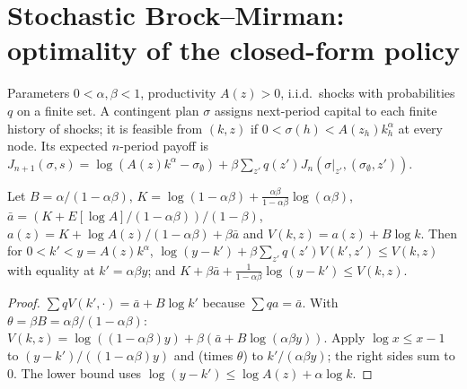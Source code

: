 \section{Stochastic Brock--Mirman: optimality of the closed-form policy}
\label{sec:stochastic_brock_mirman}

\begin{definition}
\label{def:sbm}
\leanok
Parameters $0<\alpha,\beta<1$, productivity $A(z)>0$, i.i.d.\ shocks with probabilities $q$ on a finite set. A
contingent plan $\sigma$ assigns next-period capital to each finite history of shocks; it is feasible from $(k,z)$
if $0<\sigma(h)<A(z_h)k_h^\alpha$ at every node. Its expected $n$-period payoff is
$J_{n+1}(\sigma,s)=\log(A(z)k^\alpha-\sigma_\emptyset)+\beta\sum_{z'}q(z')J_n(\sigma|_{z'},(\sigma_\emptyset,z'))$.
\end{definition}

\begin{lemma}
\label{lem:sbm_bellman}
\leanok
{}
Let $B=\alpha/(1-\alpha\beta)$, $K=\log(1-\alpha\beta)+\frac{\alpha\beta}{1-\alpha\beta}\log(\alpha\beta)$,
$\bar a=(K+E[\log A]/(1-\alpha\beta))/(1-\beta)$, $a(z)=K+\log A(z)/(1-\alpha\beta)+\beta\bar a$ and
$V(k,z)=a(z)+B\log k$. Then for $0<k'<y=A(z)k^\alpha$,
$\log(y-k')+\beta\sum_{z'}q(z')V(k',z')\le V(k,z)$ with equality at $k'=\alpha\beta y$; and
$K+\beta\bar a+\frac1{1-\alpha\beta}\log(y-k')\le V(k,z)$.
\end{lemma}
\begin{proof}
\leanok
$\sum q V(k',\cdot)=\bar a+B\log k'$ because $\sum q a=\bar a$. With $\theta=\beta B=\alpha\beta/(1-\alpha\beta)$:
$V(k,z)=\log((1-\alpha\beta)y)+\beta(\bar a+B\log(\alpha\beta y))$. Apply $\log x\le x-1$ to
$(y-k')/((1-\alpha\beta)y)$ and (times $\theta$) to $k'/(\alpha\beta y)$; the right sides sum to $0$.
The lower bound uses $\log(y-k')\le\log A(z)+\alpha\log k$.
\end{proof}

